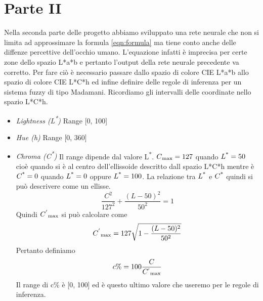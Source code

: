 \chapter{Parte II}

Nella seconda parte delle progetto abbiamo sviluppato una rete neurale che non si limita ad approssimare la formula \ref{eqn:formula} ma tiene conto anche delle diffenze percettive dell'occhio umano. L'equazione infatti è imprecisa per certe zone dello spazio L*a*b e pertanto l'output della rete neurale precedente va corretto. Per fare ciò è necessario passare dallo spazio di colore CIE L*a*b allo spazio di colore CIE L*C*h ed infine definire delle regole di inferenza per un sistema fuzzy di tipo Madamani.
Ricordiamo gli intervalli delle coordinate nello spazio L*C*h.
\begin{itemize}
	\item \textit{Lightness (L\textsuperscript{*})} Range [0, 100]
	\item \textit{Hue (h)} Range  [0, 360\textdegree] 
    \item \textit{Chroma (C\textsuperscript{*})} Il range dipende dal valore L\textsuperscript{*}. \(C\textsubscript{max}= 127\) quando 
    \(L\textsuperscript{*}=50\) cioè quando si è al centro dell'ellissoide descritto dall spazio L*C*h mentre è \(C\textsuperscript{*}=0\) quando \(L\textsuperscript{*}=0\) oppure \(L\textsuperscript{*}=100\). La relazione tra \(L\textsuperscript{*}\) e \(C\textsuperscript{*}\) quindi si può descrivere come un ellisse.
    	\begin{equation}\label{eqn:ellipse}
       		\frac{C^2}{127^2} + \frac{(L-50)^2}{50^2} = 1
       	\end{equation}
    Quindi \({C^{'}}\textsubscript{max}\) si può calcolare come
    	\begin{equation}\label{eqn:c_primo_max}
    		{C^{'}}\textsubscript{max} = 127\sqrt{1 - \frac{(L-50)^2}{50^2}}
    	\end{equation}
    Pertanto definiamo 
         \begin{equation}\label{eqn:cperc}
       		c\% = 100\frac{C}{ {C^{'}}\textsubscript{max}}
       	\end{equation}
    Il range di c\% è [0, 100] ed è questo ultimo valore che useremo per le regole di inferenza.
\end{itemize}

